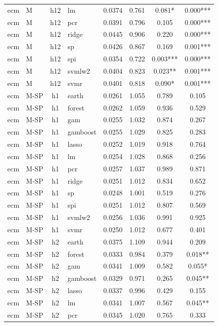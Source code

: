 \begin{ThreePartTable}
\begin{longtable}[t]{llclcccc}
ecm & M & h12 & lm & 0.0374 & 0.761 & 0.081* & 0.000***\\
ecm & M & h12 & pcr & 0.0391 & 0.796 & 0.105 & 0.000***\\
ecm & M & h12 & ridge & 0.0445 & 0.906 & 0.220 & 0.000***\\
ecm & M & h12 & sp & 0.0426 & 0.867 & 0.169 & 0.001***\\
ecm & M & h12 & spi & 0.0354 & 0.722 & 0.003*** & 0.000***\\
ecm & M & h12 & svmlw2 & 0.0404 & 0.823 & 0.023** & 0.001***\\
ecm & M & h12 & svmr & 0.0401 & 0.818 & 0.090* & 0.001***\\
\addlinespace
ecm & M-SP & h1 & earth & 0.0261 & 1.055 & 0.789 & 0.105\\
ecm & M-SP & h1 & forest & 0.0262 & 1.059 & 0.936 & 0.529\\
ecm & M-SP & h1 & gam & 0.0255 & 1.032 & 0.874 & 0.267\\
ecm & M-SP & h1 & gamboost & 0.0255 & 1.029 & 0.825 & 0.283\\
ecm & M-SP & h1 & lasso & 0.0252 & 1.019 & 0.918 & 0.764\\
ecm & M-SP & h1 & lm & 0.0254 & 1.028 & 0.868 & 0.256\\
ecm & M-SP & h1 & pcr & 0.0257 & 1.037 & 0.989 & 0.871\\
ecm & M-SP & h1 & ridge & 0.0251 & 1.012 & 0.834 & 0.652\\
ecm & M-SP & h1 & sp & 0.0248 & 1.001 & 0.519 & 0.276\\
ecm & M-SP & h1 & spi & 0.0251 & 1.012 & 0.807 & 0.569\\
ecm & M-SP & h1 & svmlw2 & 0.0256 & 1.036 & 0.991 & 0.925\\
ecm & M-SP & h1 & svmr & 0.0250 & 1.012 & 0.677 & 0.401\\
\addlinespace
ecm & M-SP & h2 & earth & 0.0375 & 1.109 & 0.944 & 0.209\\
ecm & M-SP & h2 & forest & 0.0333 & 0.984 & 0.379 & 0.018**\\
ecm & M-SP & h2 & gam & 0.0341 & 1.009 & 0.582 & 0.055*\\
ecm & M-SP & h2 & gamboost & 0.0329 & 0.971 & 0.265 & 0.045**\\
ecm & M-SP & h2 & lasso & 0.0337 & 0.996 & 0.429 & 0.155\\
ecm & M-SP & h2 & lm & 0.0341 & 1.007 & 0.567 & 0.045**\\
ecm & M-SP & h2 & pcr & 0.0345 & 1.020 & 0.765 & 0.333\\

\end{longtable}
\end{ThreePartTable}
